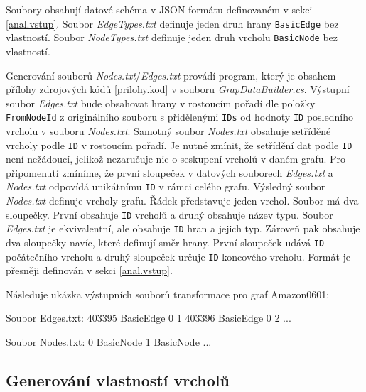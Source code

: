 Soubory obsahují datové schéma v JSON formátu definovaném v sekci \ref{anal.vstup}. 
Soubor \textit{EdgeTypes.txt} definuje jeden druh hrany \texttt{BasicEdge} bez vlastností.
Soubor \textit{NodeTypes.txt} definuje jeden druh vrcholu \texttt{BasicNode} bez vlastností.

Generování souborů \textit{Nodes.txt}/\textit{Edges.txt} provádí program, který je obsahem přílohy zdrojových kódů \ref{prilohy.kod} v souboru \textit{GrapDataBuilder.cs}.
Výstupní soubor \textit{Edges.txt} bude obsahovat hrany v rostoucím pořadí dle položky \verb+FromNodeId+ z originálního souboru s přidělenými \verb+IDs+ od hodnoty \verb+ID+ posledního vrcholu v souboru \textit{Nodes.txt}.
Samotný soubor \textit{Nodes.txt} obsahuje setříděné vrcholy podle \verb+ID+ v rostoucím pořadí. Je nutné zmínit, že setřídění dat podle \verb+ID+ není nežádoucí, jelikož nezaručuje nic o seskupení vrcholů v daném grafu.
Pro připomenutí zmíníme, že první sloupeček v datových souborech \textit{Edges.txt} a \textit{Nodes.txt} odpovídá unikátnímu \verb+ID+ v rámci celého grafu.
Výsledný soubor \textit{Nodes.txt} definuje vrcholy grafu. 
Řádek představuje jeden vrchol.
Soubor má dva sloupečky. 
První obsahuje \verb+ID+ vrcholů a druhý obsahuje název typu.
Soubor \textit{Edges.txt} je ekvivalentní, ale obsahuje \verb+ID+ hran a jejich typ.
Zároveň pak obsahuje dva sloupečky navíc, které definují směr hrany.
První sloupeček udává \verb+ID+ počátečního vrcholu a druhý sloupeček určuje \verb+ID+ koncového vrcholu.
Formát je přesněji definován v sekci \ref{anal.vstup}.

Následuje ukázka výstupních souborů transformace pro graf Amazon0601:  
\begin{code}
Soubor Edges.txt:
403395 BasicEdge 0 1
403396 BasicEdge 0 2
...

Soubor Nodes.txt:
0 BasicNode 
1 BasicNode 
...
\end{code}

\subsection{Generování vlastností vrcholů}

